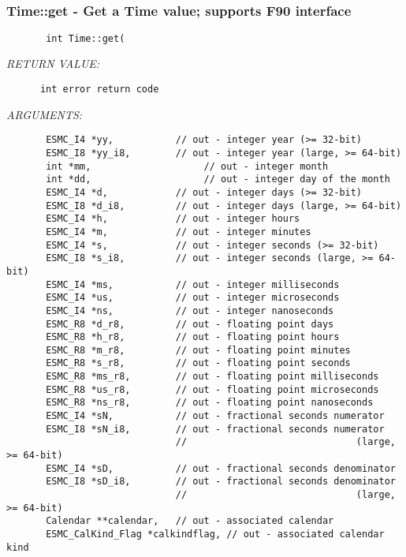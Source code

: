 \mbox{}\hrulefill\ 
 
\subsubsection [Time::get] {Time::get - Get a Time value; supports F90 interface}


  
\begin{verbatim}       int Time::get(\end{verbatim}{\em RETURN VALUE:}
\begin{verbatim}      int error return code\end{verbatim}{\em ARGUMENTS:}
\begin{verbatim}       ESMC_I4 *yy,           // out - integer year (>= 32-bit)
       ESMC_I8 *yy_i8,        // out - integer year (large, >= 64-bit)
       int *mm,                    // out - integer month
       int *dd,                    // out - integer day of the month
       ESMC_I4 *d,            // out - integer days (>= 32-bit)
       ESMC_I8 *d_i8,         // out - integer days (large, >= 64-bit)
       ESMC_I4 *h,            // out - integer hours
       ESMC_I4 *m,            // out - integer minutes
       ESMC_I4 *s,            // out - integer seconds (>= 32-bit)
       ESMC_I8 *s_i8,         // out - integer seconds (large, >= 64-bit)
       ESMC_I4 *ms,           // out - integer milliseconds
       ESMC_I4 *us,           // out - integer microseconds
       ESMC_I4 *ns,           // out - integer nanoseconds
       ESMC_R8 *d_r8,         // out - floating point days
       ESMC_R8 *h_r8,         // out - floating point hours
       ESMC_R8 *m_r8,         // out - floating point minutes
       ESMC_R8 *s_r8,         // out - floating point seconds
       ESMC_R8 *ms_r8,        // out - floating point milliseconds
       ESMC_R8 *us_r8,        // out - floating point microseconds
       ESMC_R8 *ns_r8,        // out - floating point nanoseconds
       ESMC_I4 *sN,           // out - fractional seconds numerator
       ESMC_I8 *sN_i8,        // out - fractional seconds numerator
                              //                              (large, >= 64-bit)
       ESMC_I4 *sD,           // out - fractional seconds denominator
       ESMC_I8 *sD_i8,        // out - fractional seconds denominator
                              //                              (large, >= 64-bit)
       Calendar **calendar,   // out - associated calendar
       ESMC_CalKind_Flag *calkindflag, // out - associated calendar kind

\end{verbatim}
